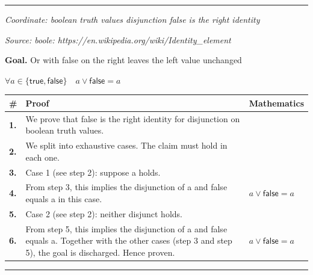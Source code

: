\documentclass[11pt]{article}
\theoremstyle{definition}
\begin{document}
\label{thm:Bool-conjunction-order_does_not_matter}
\par\medskip\hrule
\bigskip
{}\par
\smallskip\noindent\textit{Coordinate: boolean truth values \cdot disjunction \cdot false is the right identity}\par
\smallskip\noindent\textit{Source: boole: https://en.wikipedia.org/wiki/Identity\_element}\par
\medskip
\noindent\textbf{Goal.} Or with false on the right leaves the left value unchanged\par
\noindent$\displaystyle \forall a \in \{\mathsf{true}, \mathsf{false}\}\quad a \lor \mathsf{false} = a$\par
\medskip
\noindent
\begin{tabular}{@{} >{\raggedright\arraybackslash}p{} >{\raggedright\arraybackslash}p{} >{\raggedleft\arraybackslash}p{} @{}}
\textbf{\#} & \textbf{Proof} & \textbf{Mathematics} \\
\midrule
\textbf{1.} & We prove that false is the right identity for disjunction on boolean truth values. & \\[0.45em]
\textbf{2.} & We split into exhaustive cases. The claim must hold in each one. & \\[0.45em]
\textbf{3.} & Case 1 (see step 2): suppose a holds. & \\[0.45em]
\textbf{4.} & From step 3, this implies the disjunction of a and false equals a in this case. & $\displaystyle a \lor \mathsf{false} = a$ \\[0.45em]
\textbf{5.} & Case 2 (see step 2): neither disjunct holds. & \\[0.45em]
\textbf{6.} & From step 5, this implies the disjunction of a and false equals a. Together with the other cases (step 3 and step 5), the goal is discharged. Hence proven. & $\displaystyle a \lor \mathsf{false} = a$ \\[0.45em]
\bottomrule
\end{tabular}
\label{thm:Bool-disjunction-false_is_the_right_identity}
\par\medskip\hrule
\bigskip
{}\par
\end{document}
